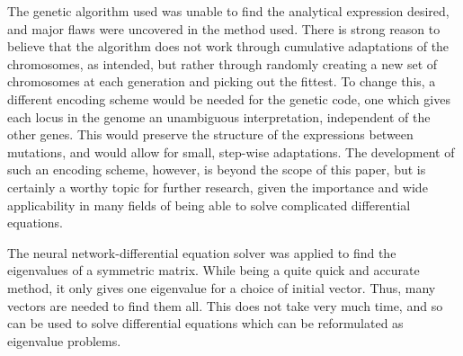 \documentclass[multicolumn, 9pt]{extarticle}
\begin{document}
The genetic algorithm used was unable to find the analytical expression desired, and major flaws were uncovered in the method used. There is strong reason to believe that the algorithm does not work through cumulative adaptations of the chromosomes, as intended, but rather through randomly creating a new set of chromosomes at each generation and picking out the fittest. To change this, a different encoding scheme would be needed for the genetic code, one which gives each locus in the genome an unambiguous interpretation, independent of the other genes. This would preserve the structure of the expressions between mutations, and would allow for small, step-wise adaptations. The development of such an encoding scheme, however, is beyond the scope of this paper, but is certainly a worthy topic for further research, given the importance and wide applicability in many fields of being able to solve complicated differential equations.

The neural network-differential equation solver was applied to find the eigenvalues of a symmetric matrix. While being a quite quick and accurate method, it only gives one eigenvalue for a choice of initial vector. Thus, many vectors are needed to find them all. This does not take very much time, and so can be used to solve differential equations which can be reformulated as eigenvalue problems. 




\end{document}
